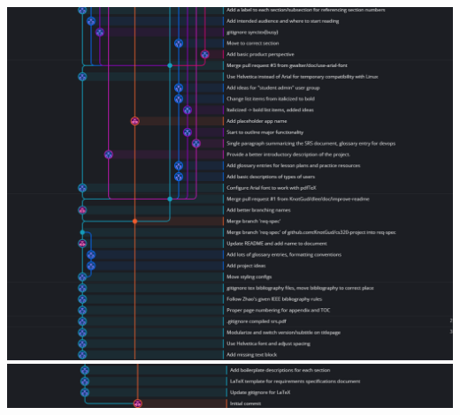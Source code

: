 \begin{center}
        \includegraphics[width=.8\textwidth]{images/4.png}
        \includegraphics[width=.8\textwidth]{images/5.png}
    \end{center}
